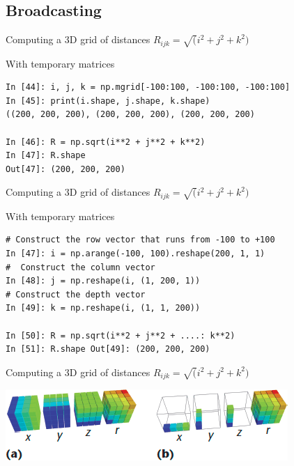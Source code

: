 \subsection{Broadcasting}
\begin{frame}[fragile]
 Computing a 3D grid of distances $R_{ijk} = \sqrt(i^2 + j^2 + k^2)$
 \begin{block}{With temporary matrices}
   \begin{verbatim}
In [44]: i, j, k = np.mgrid[-100:100, -100:100, -100:100]
In [45]: print(i.shape, j.shape, k.shape)
((200, 200, 200), (200, 200, 200), (200, 200, 200)

In [46]: R = np.sqrt(i**2 + j**2 + k**2)
In [47]: R.shape
Out[47]: (200, 200, 200)
\end{verbatim}
\end{block}
\end{frame}

\begin{frame}[fragile]
 Computing a 3D grid of distances $R_{ijk} = \sqrt(i^2 + j^2 + k^2)$
 \begin{block}{With temporary matrices}
   \begin{verbatim}
# Construct the row vector that runs from -100 to +100
In [47]: i = np.arange(-100, 100).reshape(200, 1, 1)
#  Construct the column vector
In [48]: j = np.reshape(i, (1, 200, 1))
# Construct the depth vector
In [49]: k = np.reshape(i, (1, 1, 200))

In [50]: R = np.sqrt(i**2 + j**2 + ....: k**2)
In [51]: R.shape Out[49]: (200, 200, 200)
\end{verbatim}
 \end{block}
\end{frame}

\begin{frame}[fragile]
 Computing a 3D grid of distances $R_{ijk} = \sqrt(i^2 + j^2 + k^2)$
 \begin{center}
   \includegraphics[scale=.5]{../figures/numpy/broadcasting.png}
 \end{center}
\end{frame}
